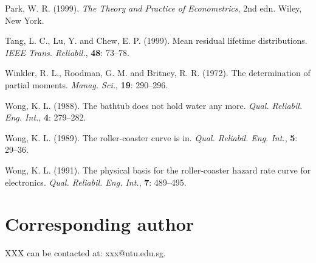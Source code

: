 \documentclass{ijcs_template}
\begin{document}
\begin{thebibliography}
Park, W. R. (1999). {\it The Theory and Practice of
Econometrics}, 2nd edn. Wiley, New York.

Tang, L. C., Lu, Y. and Chew, E. P. (1999). Mean residual lifetime
distributions. {\it IEEE Trans. Reliabil.}, {\bf 48}: 73--78.

Winkler, R. L., Roodman, G. M. and Britney, R. R. (1972). The
determination of partial moments. {\it Manag. Sci.},
{\bf 19}: 290--296.

Wong, K. L. (1988). The bathtub does not hold water any more.
{\it Qual. Reliabil. Eng. Int.}, {\bf 4}: 279--282.

Wong, K. L. (1989). The roller-coaster curve is in.
{\it Qual. Reliabil. Eng. Int.}, {\bf 5}: 29--36.

Wong, K. L. (1991). The physical basis for the roller-coaster
hazard rate curve for electronics. {\it Qual. Reliabil.
Eng. Int.}, {\bf 7}: 489--495.
\end{thebibliography}


\section*{Corresponding author}
XXX can be contacted at: xxx@ntu.edu.sg.
\end{document}
